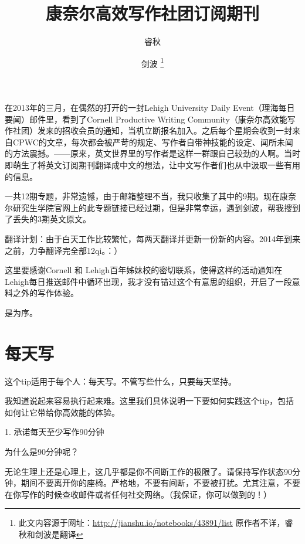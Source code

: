 \documentclass{ctexart}
\begin{document}
\kaishu
{}

\title {\large {\heiti 康奈尔高效写作社团订阅期刊}}
\author {睿秋 \and 剑波
    \footnote{此文内容源于网址：\url{http://jianshu.io/notebooks/43891/list} \newline \hspace*{1.8\ccwd}原作者不详，睿秋和剑波是翻译}}
\maketitle

在2013年的三月，在偶然的打开的一封Lehigh University Daily Event（理海每日要闻）邮件里，看到了Cornell Productive Writing Community（康奈尔高效能写作社团）发来的招收会员的通知，当机立断报名加入。之后每个星期会收到一封来自CPWC的文章，每次都会被严苛的规定、写作者自带神技能的设定、闻所未闻的方法震撼。——原来，英文世界里的写作者是这样一群跟自己较劲的人啊。当时即萌生了将英文订阅期刊翻译成中文的想法，让中文写作者们也从中汲取一些有用的信息。

一共12期专题，非常遗憾，由于邮箱整理不当，我只收集了其中的9期。现在康奈尔研究生学院官网上的此专题链接已经过期，但是非常幸运，遇到剑波，帮我搜到了丢失的3期英文原文。

翻译计划：由于白天工作比较繁忙，每两天翻译并更新一份新的内容。2014年到来之前，力争翻译完全部12qi。：）

这里要感谢Cornell 和 Lehigh百年姊妹校的密切联系，使得这样的活动通知在Lehigh每日推送邮件中循环出现，我才没有错过这个有意思的组织，开启了一段意料之外的写作体验。

是为序。
\newpage

\tableofcontents %
\newpage %

\section{每天写}
这个tip适用于每个人：每天写。不管写些什么，只要每天坚持。

我知道说起来容易执行起来难。这里我们具体说明一下要如何实践这个tip，包括如何让它带给你高效能的体验。

1. 承诺每天至少写作90分钟

为什么是90分钟呢？

无论生理上还是心理上，这几乎都是你不间断工作的极限了。请保持写作状态90分钟，期间不要离开你的座椅。严格地，不要有间断，不要被打扰。尤其注意，不要在你写作的时候查收邮件或者任何社交网络。（我保证，你可以做到的！）
\end{document}

